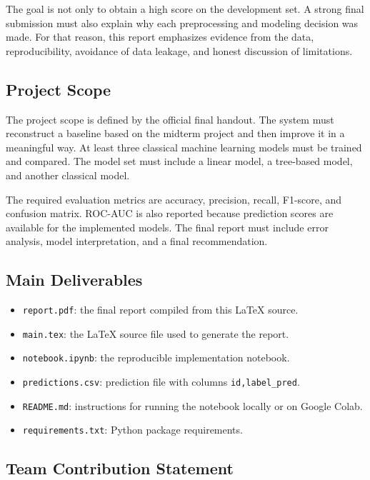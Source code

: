 ﻿\documentclass[12pt,a4paper]{article}
\begin{document}
The goal is not only to obtain a high score on the development set. A strong final submission must also explain why each preprocessing and modeling decision was made. For that reason, this report emphasizes evidence from the data, reproducibility, avoidance of data leakage, and honest discussion of limitations.

\subsection{Project Scope}

The project scope is defined by the official final handout. The system must reconstruct a baseline based on the midterm project and then improve it in a meaningful way. At least three classical machine learning models must be trained and compared. The model set must include a linear model, a tree-based model, and another classical model.

The required evaluation metrics are accuracy, precision, recall, F1-score, and confusion matrix. ROC-AUC is also reported because prediction scores are available for the implemented models. The final report must include error analysis, model interpretation, and a final recommendation.

\subsection{Main Deliverables}

\begin{itemize}
    \item \texttt{report.pdf}: the final report compiled from this LaTeX source.
    \item \texttt{main.tex}: the LaTeX source file used to generate the report.
    \item \texttt{notebook.ipynb}: the reproducible implementation notebook.
    \item \texttt{predictions.csv}: prediction file with columns \texttt{id,label\_pred}.
    \item \texttt{README.md}: instructions for running the notebook locally or on Google Colab.
    \item \texttt{requirements.txt}: Python package requirements.
\end{itemize}

\subsection{Team Contribution Statement}
\end{document}
